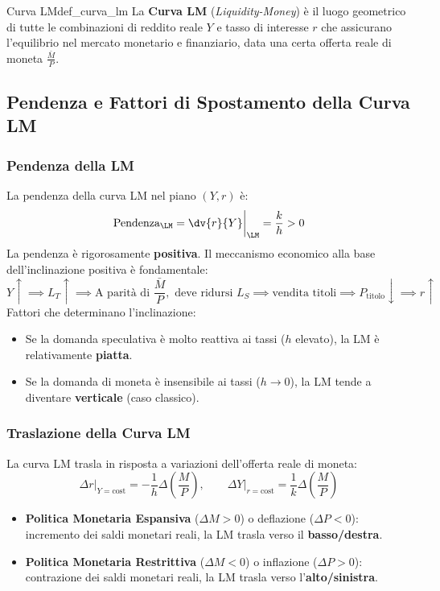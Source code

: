 \begin{definizione}{Curva LM}{def_curva_lm}
La \textbf{Curva LM} (\textit{Liquidity-Money}) è il luogo geometrico di tutte le combinazioni di reddito reale $Y$ e tasso di interesse $r$ che assicurano l'equilibrio nel mercato monetario e finanziario, data una certa offerta reale di moneta $\frac{\bar{M}}{P}$.
\end{definizione}

\subsection{Pendenza e Fattori di Spostamento della Curva LM}

\subsubsection{Pendenza della LM}
La pendenza della curva LM nel piano $(Y, r)$ è:
\begin{equation}
    \text{Pendenza}_{\LM} = \dv{r}{Y}\bigg|_{\LM} = \frac{k}{h} > 0
\end{equation}
La pendenza è rigorosamente \textbf{positiva}. Il meccanismo economico alla base dell'inclinazione positiva è fondamentale:
\begin{equation}
    Y \uparrow \implies L_T \uparrow \implies \text{A parità di } \frac{\bar{M}}{P}, \text{ deve ridursi } L_S \implies \text{vendita titoli} \implies P_{\text{titolo}} \downarrow \implies r \uparrow
\end{equation}
Fattori che determinano l'inclinazione:
\begin{itemize}
    \item Se la domanda speculativa è molto reattiva ai tassi ($h$ elevato), la LM è relativamente \textbf{piatta}.
    \item Se la domanda di moneta è insensibile ai tassi ($h \to 0$), la LM tende a diventare \textbf{verticale} (caso classico).
\end{itemize}

\subsubsection{Traslazione della Curva LM}
La curva LM trasla in risposta a variazioni dell'offerta reale di moneta:
\begin{equation}
    \Delta r\big|_{Y=\text{cost}} = -\frac{1}{h} \Delta\left(\frac{M}{P}\right), \qquad \Delta Y\big|_{r=\text{cost}} = \frac{1}{k} \Delta\left(\frac{M}{P}\right)
\end{equation}
\begin{itemize}
    \item \textbf{Politica Monetaria Espansiva} ($\Delta M > 0$) o deflazione ($\Delta P < 0$): incremento dei saldi monetari reali, la LM trasla verso il \textbf{basso/destra}.
    \item \textbf{Politica Monetaria Restrittiva} ($\Delta M < 0$) o inflazione ($\Delta P > 0$): contrazione dei saldi monetari reali, la LM trasla verso l'\textbf{alto/sinistra}.
\end{itemize}

